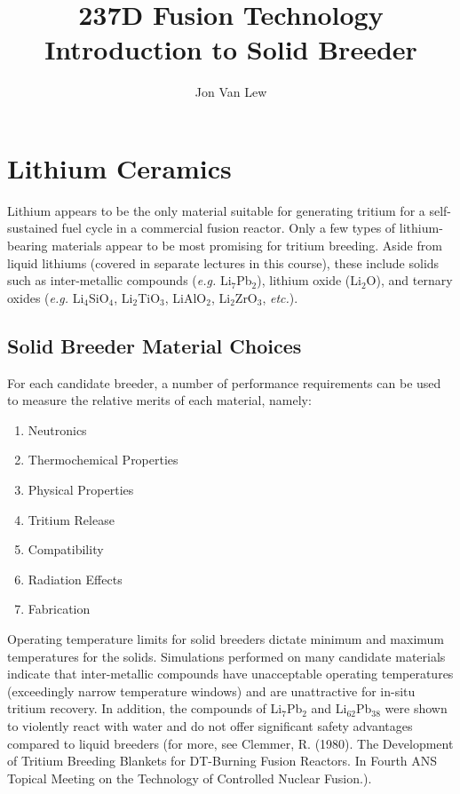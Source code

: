 \documentclass[11pt]{report} %
\title{237D Fusion Technology \\
Introduction to Solid Breeder}
\author{Jon Van Lew}
\newcommand{\lit}{Li$_2$TiO$_3$}
\newcommand{\lis}{Li$_4$SiO$_4$}
\newcommand{\lio}{Li$_2$O}
\newcommand{\liz}{Li$_2$ZrO$_3$}
\newcommand{\lial}{LiAlO$_2$}
\begin{document}
\maketitle
\chapter{Lithium Ceramics}
Lithium appears to be the only material suitable for generating tritium for a self-sustained fuel cycle in a commercial fusion reactor. Only a few types of lithium-bearing materials appear to be most promising for tritium breeding. Aside from liquid lithiums (covered in separate lectures in this course), these include solids such as inter-metallic compounds (\textit{e.g.} Li$_7$Pb$_2$), lithium oxide (\lio), and ternary oxides (\textit{e.g.} \lis, \lit, \lial, \liz, \textit{etc.}).








\section{Solid Breeder Material Choices}
For each candidate breeder, a number of performance requirements can be used to measure the relative merits of each material, namely:
\begin{enumerate}
\item Neutronics
\item Thermochemical Properties
\item Physical Properties
\item Tritium Release
\item Compatibility
\item Radiation Effects
\item Fabrication
\end{enumerate}
Operating temperature limits for solid breeders dictate minimum and maximum temperatures for the solids. Simulations performed on many candidate materials indicate that inter-metallic compounds have unacceptable operating temperatures (exceedingly narrow temperature windows) and are unattractive for in-situ tritium recovery. In addition, the compounds of Li$_7$Pb$_2$ and Li$_62$Pb$_38$ were shown to violently react with water and do not offer significant safety advantages compared to liquid breeders (for more, see Clemmer, R. (1980). The Development of Tritium Breeding Blankets for DT-Burning Fusion Reactors. In Fourth ANS Topical Meeting on the Technology of Controlled Nuclear Fusion.).
\end{document}
